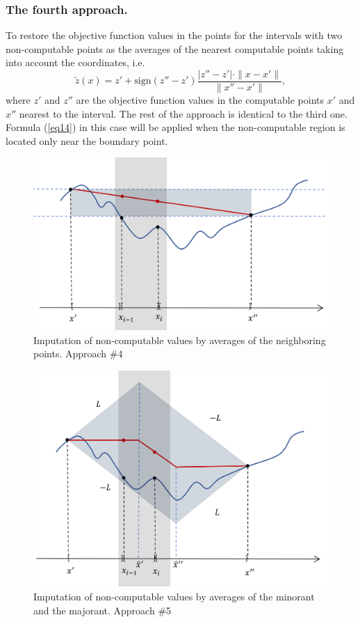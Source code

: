 \documentclass[runningheads]{llncs}
\begin{document}
\subsubsection{The fourth approach.} To restore the objective function values in the points for the intervals with two non-computable points as the averages of the nearest computable points taking into account the coordinates, i.e.
\begin{equation}\label{eq17} 
\tilde{z}(x)=z'+ \text{sign}(z''-z') \frac {|z''-z'| \cdot \| x-x' \|}{\| x''-x' \|},
\end{equation}
where $z'$ and $z''$ are the objective function values in the computable points $x'$ and $x''$  nearest to the interval.
The rest of the approach is identical to the third one. Formula (\ref{eq14}) in this case will be applied when the non-computable region is located only near the boundary point.
\begin{figure}
\includegraphics[width=\textwidth]{fig4.png}
\caption{Imputation of non-computable values by averages of the neighboring points. Approach \#4} \label{fig4}
\end{figure}
\begin{figure}
\includegraphics[width=\textwidth]{fig5.png}
\caption{Imputation of non-computable values by averages of the minorant and the majorant. Approach \#5} \label{fig5}
\end{figure}
\end{document}
